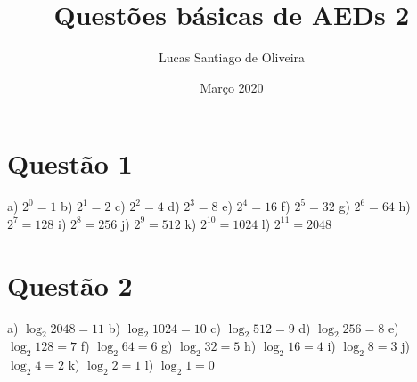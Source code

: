 \documentclass{article}
\title{Questões básicas de AEDs 2}
\author{Lucas Santiago de Oliveira}
\date{Março 2020}
\begin{document}
\maketitle
\tableofcontents
\newpage

\section{Questão 1}
    a) $2^0 = 1$ \newline
    b) $2^1 = 2$ \newline
    c) $2^2 = 4$ \newline
    d) $2^3 = 8$ \newline
    e) $2^4 = 16$ \newline
    f) $2^5 = 32$ \newline
    g) $2^6 = 64$ \newline
    h) $2^7 = 128$ \newline
    i) $2^8 = 256$ \newline
    j) $2^9 = 512$ \newline
    k) $2^10 = 1024$ \newline
    l) $2^11 = 2048$

\section{Questão 2}
    a) $\log_2 2048 = 11$ \newline
    b) $\log_2 1024 = 10$ \newline
    c) $\log_2 512 = 9$ \newline
    d) $\log_2 256 = 8$ \newline
    e) $\log_2 128 = 7$ \newline
    f) $\log_2 64 = 6$ \newline
    g) $\log_2 32 = 5$ \newline
    h) $\log_2 16 = 4$ \newline
    i) $\log_2 8 = 3$ \newline
    j) $\log_2 4 = 2$ \newline
    k) $\log_2 2 = 1$ \newline
    l) $\log_2 1 = 0$
    
\end{document}

